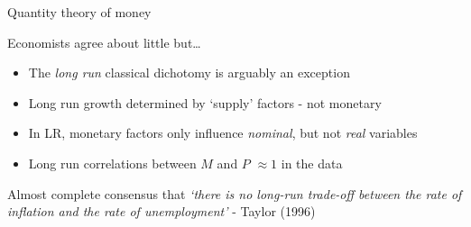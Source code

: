 

\begin{frame}{Quantity theory of money}

Economists agree about little but\ldots
\begin{itemize}
\item 	The \emph{long run} classical dichotomy is arguably an exception
\item 	Long run growth determined by `supply' factors - not monetary
\item 	In LR, monetary factors only influence \emph{nominal}, but not \emph{real} variables
\item	Long run correlations between $M$ and $P$ $\approx 1$ in the data
\end{itemize}

\vspace{2mm}
Almost complete consensus that \emph{`there is no long-run trade-off between the rate of inflation and the rate of unemployment'} - Taylor (1996)

\end{frame}



